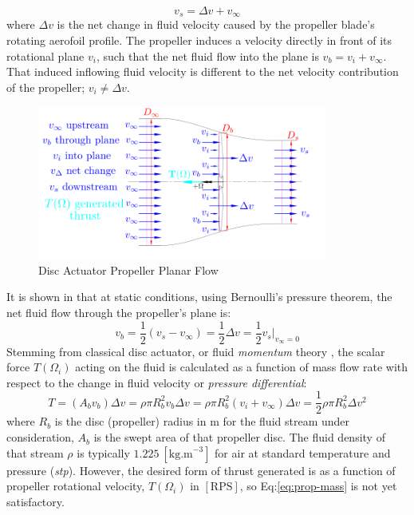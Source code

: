 \begin{equation}
v_s = \Delta v + v_\infty
\end{equation}
where $\Delta v$ is the net change in fluid velocity caused by the propeller blade's rotating aerofoil profile. The propeller induces a velocity directly in front of its rotational plane $v_i$, such that the net fluid flow into the plane is $v_b=v_i+v_\infty$. That induced inflowing fluid velocity is different to the net velocity contribution of the propeller; $v_i\not=\Delta v$.
\par
\begin{figure}[htbp]
\centering
\includegraphics[width=0.85\textwidth]{figs/bem-flow}
\vspace{-12pt}
\caption{Disc Actuator Propeller Planar Flow}
\label{fig:bem-flow}
\vspace{-15pt}
\end{figure}
It is shown in \cite{bladesforquadrotors} that at static conditions, using Bernoulli's pressure theorem, the net fluid flow through the propeller's plane is:
\begin{equation}\label{eq:bernoulli}
v_b = \frac{1}{2} ( v_s - v_{\infty} ) = \frac{1}{2} \Delta v = \frac{1}{2} v_s \big|_{v_\infty=0}
\end{equation}
Stemming from classical disc actuator, or fluid \emph{momentum} theory \cite{fluidmomentum,propellers}, the scalar force $T(\Omega_i)$ acting on the fluid is calculated as a function of mass flow rate with respect to the change in fluid velocity or \emph{pressure differential}:
\begin{equation}\label{eq:prop-mass}
T=(A_b v_b)\Delta v = \rho \pi R_b^2v_b \Delta v = \rho \pi R_b^2(v_i+v_\infty)\Delta v = \frac{1}{2} \rho \pi R_b^2 \Delta v^2
\end{equation}
where $R_b$ is the disc (propeller) radius in $\text{m}$ for the fluid stream under consideration, $A_b$ is the swept area of that propeller disc. The fluid density of that stream $\rho$ is typically $1.225~[\text{kg.m}^{-3}]$ for air at standard temperature and pressure (\emph{stp}). However, the desired form of thrust generated is as a function of propeller rotational velocity, $T(\Omega_i)$ in $[\text{RPS}]$, so Eq:\ref{eq:prop-mass} is not yet satisfactory. 
